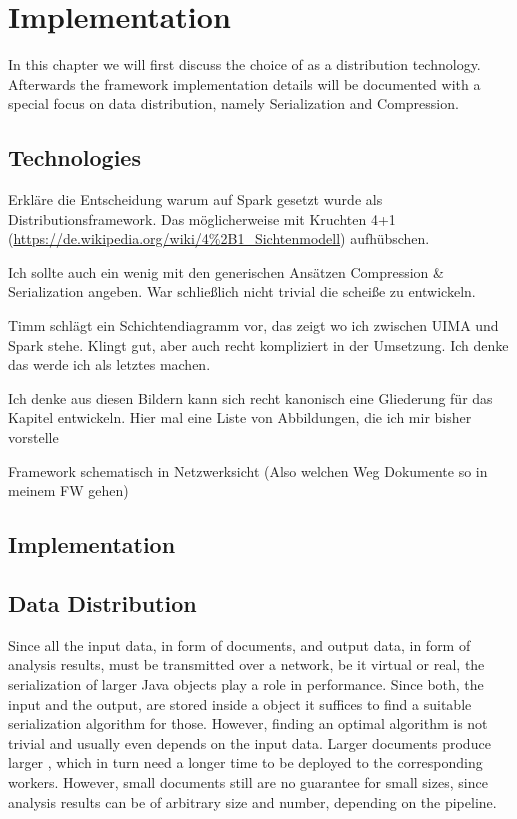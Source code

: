 \chapter{Implementation}
\label{ch:implementation}
In this chapter we will first discuss the choice of \spark{} as a distribution technology. Afterwards the framework implementation details will be documented with a special focus on data distribution, namely Serialization and Compression.
\section{Technologies}


Erkläre die Entscheidung warum auf Spark gesetzt wurde als Distributionsframework. Das möglicherweise mit Kruchten 4+1 (\url{https://de.wikipedia.org/wiki/4\%2B1_Sichtenmodell})  aufhübschen.

Ich sollte auch ein wenig mit den generischen Ansätzen Compression \& Serialization angeben. War schließlich nicht trivial die scheiße zu entwickeln.

Timm schlägt ein Schichtendiagramm vor, das zeigt wo ich zwischen UIMA und Spark stehe. Klingt gut, aber auch recht kompliziert in der Umsetzung. Ich denke das werde ich als letztes machen.

Ich denke aus diesen Bildern kann sich recht kanonisch eine Gliederung für das Kapitel entwickeln. Hier mal eine Liste von Abbildungen, die ich mir bisher vorstelle

Framework schematisch in Netzwerksicht (Also welchen Weg Dokumente so in meinem FW gehen)



\section{Implementation}


\section{Data Distribution}
Since all the input data, in form of documents, and output data, in form of analysis results, must be transmitted over a network, be it virtual or real, the serialization of larger Java objects play a role in performance. Since both, the input and the output, are stored inside a \cas{} object it suffices to find a suitable serialization algorithm for those. However, finding an optimal algorithm is not trivial and usually even depends on the input data. Larger documents produce larger \cas{}, which in turn need a longer time to be deployed to the corresponding \spark{} workers. However, small documents still are no guarantee for small \cas{} sizes, since analysis results can be of arbitrary size and number, depending on the \uima{} pipeline. 

